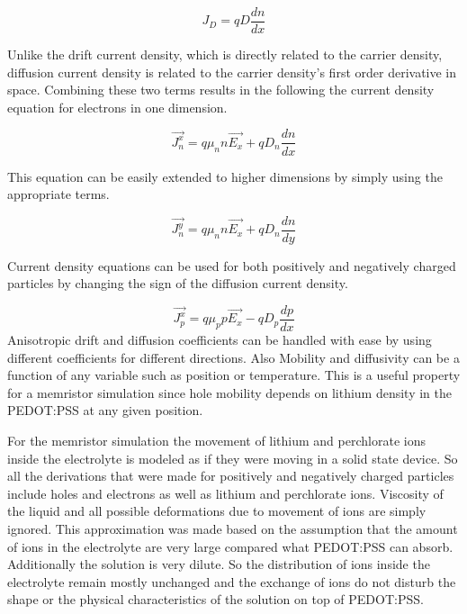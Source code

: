 \begin{doublespace}
\begin{equation}
J_D=qD\frac{dn}{dx}
\end{equation}

Unlike the drift current density, which is directly related to the carrier density, diffusion current density is related to the carrier density's first order derivative in space. Combining these two terms results in the following the current density equation for electrons in one dimension.

\begin{equation}
\vec{J_n^x}=q \mu_{n} n \vec{E_x}+qD_{n} \frac{dn}{dx} 
\label{cdenn}
\end{equation}

This equation can be easily extended to higher dimensions by simply using the appropriate terms.


\begin{equation}
\vec{J_n^y}=q \mu_{n} n \vec{E_x}+qD_{n} \frac{dn}{dy} 
\end{equation}

Current density equations can be used for both positively and negatively charged particles by changing the sign of the diffusion current density.

\begin{equation}
\vec{J_p^x}=q \mu_{p} p \vec{E_x}-qD_{p} \frac{dp}{dx} 
\label{cdenp}
\end{equation}
Anisotropic drift and diffusion coefficients can be handled with ease by using different coefficients for different directions. Also Mobility and diffusivity can be a function of any variable such as position or temperature. This is a useful property for a memristor simulation since hole mobility depends on lithium density in the PEDOT:PSS at any given position. 

For the memristor simulation the movement of lithium and perchlorate ions inside the electrolyte is modeled as if they were moving in a solid state device. So all the derivations that were made for positively and negatively charged particles include holes and electrons as well as lithium and perchlorate ions. Viscosity of the liquid and all possible deformations due to movement of ions are simply ignored. This approximation was made based on the assumption that the amount of ions in the electrolyte are very large compared what PEDOT:PSS can absorb. Additionally the solution is very dilute. So the distribution of ions inside the electrolyte remain mostly unchanged and the exchange of ions do not disturb the shape or the physical characteristics of the solution on top of PEDOT:PSS.  


\end{doublespace}
